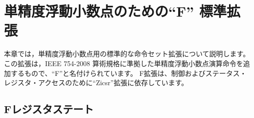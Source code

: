 \begin{comment}
\chapter{``F'' Standard Extension for Single-Precision Floating-Point,
Version 2.2}
\end{comment}
\chapter{単精度浮動小数点のための``F'' 標準拡張}
\label{sec:single-float}

\begin{comment}
This chapter describes the standard instruction-set extension for
single-precision floating-point, which is named ``F'' and adds
single-precision floating-point computational instructions compliant
with the IEEE 754-2008 arithmetic standard~\cite{ieee754-2008}.
The F extension depends on the ``Zicsr'' extension for control
and status register access.
\end{comment}

本章では，単精度浮動小数点用の標準的な命令セット拡張について説明します。
この拡張は，IEEE 754-2008 算術規格に準拠した単精度浮動小数点演算命令を追加するもので、``F''と名付けられています。
F拡張は、制御およびステータス・レジスタ・アクセスのために``Zicsr''拡張に依存しています。

\begin{comment}
\section{F Register State}
\end{comment}
\section{Fレジスタステート}

\begin{comment}
The F extension adds 32 floating-point registers, {\tt f0}--{\tt f31},
each 32 bits wide, and a floating-point control and status register
{\tt fcsr}, which contains the operating mode and exception status of the
floating-point unit.  This additional state is shown in
Figure~\ref{fprs}.  We use the term FLEN to describe the width of the
floating-point registers in the RISC-V ISA, and FLEN=32 for the F
single-precision floating-point extension.  Most floating-point
instructions operate on values in the floating-point register file.
Floating-point load and store instructions transfer floating-point
values between registers and memory.  Instructions to transfer values
to and from the integer register file are also provided.
\end{comment}

